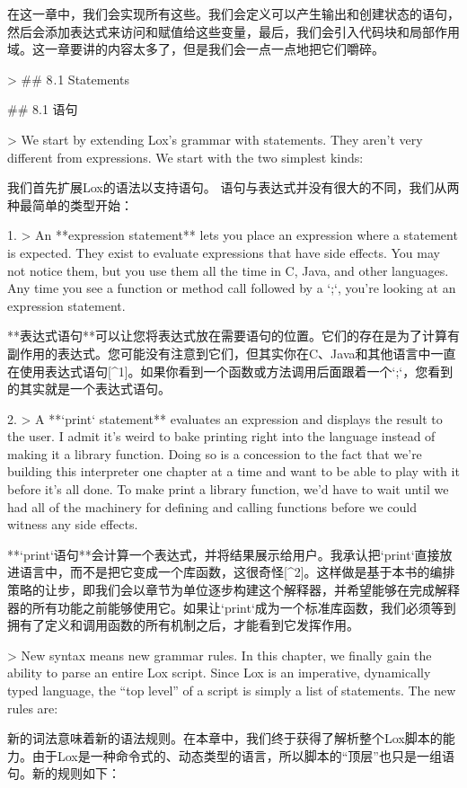 \documentclass[cn,11pt,chinese]{elegantbook}
\begin{document}
{{{在这一章中，我们会实现所有这些。我们会定义可以产生输出和创建状态的语句，然后会添加表达式来访问和赋值给这些变量，最后，我们会引入代码块和局部作用域。这一章要讲的内容太多了，但是我们会一点一点地把它们嚼碎。

> ## 8 . 1 Statements

## 8.1 语句

> We start by extending Lox’s grammar with statements. They aren’t very different from expressions. We start with the two simplest kinds:

我们首先扩展Lox的语法以支持语句。 语句与表达式并没有很大的不同，我们从两种最简单的类型开始：

1. > An **expression statement** lets you place an expression where a statement is expected. They exist to evaluate expressions that have side effects. You may not notice them, but you use them all the time in C, Java, and other languages. Any time you see a function or method call followed by a `;`, you’re looking at an expression statement.

   **表达式语句**可以让您将表达式放在需要语句的位置。它们的存在是为了计算有副作用的表达式。您可能没有注意到它们，但其实你在C、Java和其他语言中一直在使用表达式语句[^1]。如果你看到一个函数或方法调用后面跟着一个`;`，您看到的其实就是一个表达式语句。

2. > A **`print` statement** evaluates an expression and displays the result to the user. I admit it’s weird to bake printing right into the language instead of making it a library function. Doing so is a concession to the fact that we’re building this interpreter one chapter at a time and want to be able to play with it before it’s all done. To make print a library function, we’d have to wait until we had all of the machinery for defining and calling functions before we could witness any side effects.

   **`print`语句**会计算一个表达式，并将结果展示给用户。我承认把`print`直接放进语言中，而不是把它变成一个库函数，这很奇怪[^2]。这样做是基于本书的编排策略的让步，即我们会以章节为单位逐步构建这个解释器，并希望能够在完成解释器的所有功能之前能够使用它。如果让`print`成为一个标准库函数，我们必须等到拥有了定义和调用函数的所有机制之后，才能看到它发挥作用。

> New syntax means new grammar rules. In this chapter, we finally gain the ability to parse an entire Lox script. Since Lox is an imperative, dynamically typed language, the “top level” of a script is simply a list of statements. The new rules are:

新的词法意味着新的语法规则。在本章中，我们终于获得了解析整个Lox脚本的能力。由于Lox是一种命令式的、动态类型的语言，所以脚本的“顶层”也只是一组语句。新的规则如下：

}}}
\end{document}
